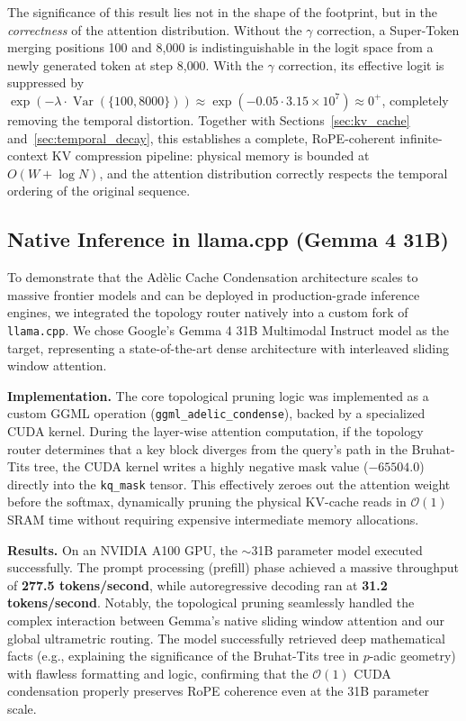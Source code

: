 \documentclass[11pt,a4paper]{article}
\begin{document}
The significance of this result lies not in the shape of the footprint, but in the \emph{correctness} of the attention distribution. Without the $\gamma$ correction, a Super-Token merging positions 100 and 8{,}000 is indistinguishable in the logit space from a newly generated token at step 8{,}000. With the $\gamma$ correction, its effective logit is suppressed by $\exp(-\lambda \cdot \operatorname{Var}(\{100, 8000\})) \approx \exp(-0.05 \cdot 3.15 \times 10^7) \approx 0^+$, completely removing the temporal distortion. Together with Sections~\ref{sec:kv_cache} and~\ref{sec:temporal_decay}, this establishes a complete, RoPE-coherent infinite-context KV compression pipeline: physical memory is bounded at $O(W + \log N)$, and the attention distribution correctly respects the temporal ordering of the original sequence.

\subsection{Native Inference in llama.cpp (Gemma 4 31B)}
\label{sec:llamacpp}

To demonstrate that the Adèlic Cache Condensation architecture scales to massive frontier models and can be deployed in production-grade inference engines, we integrated the topology router natively into a custom fork of \texttt{llama.cpp}. We chose Google's Gemma 4 31B Multimodal Instruct model as the target, representing a state-of-the-art dense architecture with interleaved sliding window attention.

\textbf{Implementation.} The core topological pruning logic was implemented as a custom GGML operation (\texttt{ggml\_adelic\_condense}), backed by a specialized CUDA kernel. During the layer-wise attention computation, if the topology router determines that a key block diverges from the query's path in the Bruhat-Tits tree, the CUDA kernel writes a highly negative mask value ($-65504.0$) directly into the \texttt{kq\_mask} tensor. This effectively zeroes out the attention weight before the softmax, dynamically pruning the physical KV-cache reads in $\mathcal{O}(1)$ SRAM time without requiring expensive intermediate memory allocations.

\textbf{Results.} On an NVIDIA A100 GPU, the $\sim$31B parameter model executed successfully. The prompt processing (prefill) phase achieved a massive throughput of \textbf{277.5 tokens/second}, while autoregressive decoding ran at \textbf{31.2 tokens/second}. Notably, the topological pruning seamlessly handled the complex interaction between Gemma's native sliding window attention and our global ultrametric routing. The model successfully retrieved deep mathematical facts (e.g., explaining the significance of the Bruhat-Tits tree in $p$-adic geometry) with flawless formatting and logic, confirming that the $\mathcal{O}(1)$ CUDA condensation properly preserves RoPE coherence even at the 31B parameter scale.
\end{document}
